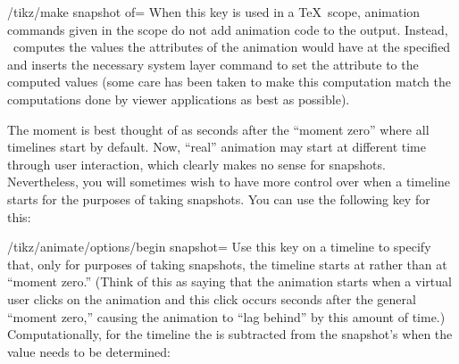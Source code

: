 \begin{key}{/tikz/make snapshot of=}
  When this key is used in a \TeX\ scope, animation commands given in
  the scope do not add animation code to the output. Instead,
  \tikzname\ computes the values the attributes of the animation would
  have at the specified  and inserts the necessary system
  layer command to set the attribute to the computed values (some care
  has been taken to make this computation match the computations done
  by viewer applications as best as possible). 
  
\begin{codeexample}[]
\end{codeexample}

  The moment  is best thought of as  seconds
  after the ``moment zero'' where all timelines start by default. Now,
  ``real'' animation may start at different time through user
  interaction, which clearly makes no sense for
  snapshots. Nevertheless, you will sometimes wish to have more
  control over when a timeline starts for the purposes of taking
  snapshots. You can use the following key for this:

  \begin{key}{/tikz/animate/options/begin snapshot=}
    Use this key on a timeline to specify that, only for purposes of
    taking snapshots, the timeline starts at  rather
    than at ``moment zero.'' (Think of this as saying that the
    animation starts when a virtual user clicks on the animation and
    this click occurs  seconds after the general
    ``moment zero,'' causing the animation to ``lag behind'' by this
    amount of time.) Computationally, for the timeline the  is subtracted from the snapshot's  when the
    value needs to be determined: 
\begin{codeexample}[]
\end{codeexample}
  \end{key}


\end{key}
